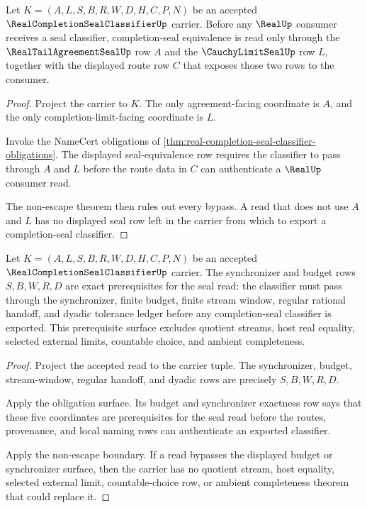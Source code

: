 \begin{theorem}
\label{thm:real-completion-seal-classifier-seal-equivalence}
Let $K=(A,L,S,B,R,W,D,H,C,P,N)$ be an accepted $\RealCompletionSealClassifierUp$ carrier. Before any $\RealUp$ consumer receives a seal classifier, completion-seal equivalence is read only through the $\RealTailAgreementSealUp$ row $A$ and the $\CauchyLimitSealUp$ row $L$, together with the displayed route row $C$ that exposes those two rows to the consumer.
\end{theorem}
\begin{proof}
Project the carrier to $K$. The only agreement-facing coordinate is $A$, and the only completion-limit-facing coordinate is $L$.

Invoke the NameCert obligations of \autoref{thm:real-completion-seal-classifier-obligations}. The displayed seal-equivalence row requires the classifier to pass through $A$ and $L$ before the route data in $C$ can authenticate a $\RealUp$ consumer read.

The non-escape theorem then rules out every bypass. A read that does not use $A$ and $L$ has no displayed seal row left in the carrier from which to export a completion-seal classifier.
\end{proof}

\begin{theorem}
\label{thm:real-completion-seal-classifier-budget-exactness}
Let $K=(A,L,S,B,R,W,D,H,C,P,N)$ be an accepted $\RealCompletionSealClassifierUp$ carrier. The synchronizer and budget rows $S,B,W,R,D$ are exact prerequisites for the seal read: the classifier must pass through the synchronizer, finite budget, finite stream window, regular rational handoff, and dyadic tolerance ledger before any completion-seal classifier is exported. This prerequisite surface excludes quotient streams, host real equality, selected external limits, countable choice, and ambient completeness.
\end{theorem}
\begin{proof}
Project the accepted read to the carrier tuple. The synchronizer, budget, stream-window, regular handoff, and dyadic rows are precisely $S,B,W,R,D$.

Apply the obligation surface. Its budget and synchronizer exactness row says that these five coordinates are prerequisites for the seal read before the routes, provenance, and local naming rows can authenticate an exported classifier.

Apply the non-escape boundary. If a read bypasses the displayed budget or synchronizer surface, then the carrier has no quotient stream, host equality, selected external limit, countable-choice row, or ambient completeness theorem that could replace it.
\end{proof}

